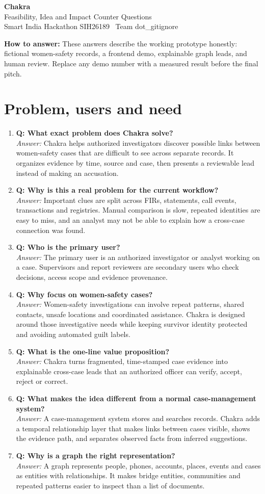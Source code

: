\documentclass[10pt,a4paper]{article}
\newcommand{\qa}[2]{\item \textbf{\color{navy}Q: #1}\\[-1pt]{\color{coral}\textit{Answer:}} #2}
\newcommand{\note}[1]{\vspace{4pt}\noindent\colorbox{paper}{\parbox{\dimexpr\linewidth-2\fboxsep}{\small\textbf{How to answer:} #1}}\vspace{6pt}}
\begin{document}
\begin{center}
{\Huge\bfseries\color{navy}Chakra}\\[3pt]
{\Large Feasibility, Idea and Impact Counter Questions}\\[5pt]
{\normalsize Smart India Hackathon SIH26189 \textbar\ Team dot\_gitignore}
\end{center}
\note{These answers describe the working prototype honestly: fictional women-safety records, a frontend demo, explainable graph leads, and human review. Replace any demo number with a measured result before the final pitch.}

\section{Problem, users and need}
\begin{enumerate}
\qa{What exact problem does Chakra solve?}{Chakra helps authorized investigators discover possible links between women-safety cases that are difficult to see across separate records. It organizes evidence by time, source and case, then presents a reviewable lead instead of making an accusation.}
\qa{Why is this a real problem for the current workflow?}{Important clues are split across FIRs, statements, call events, transactions and registries. Manual comparison is slow, repeated identities are easy to miss, and an analyst may not be able to explain how a cross-case connection was found.}
\qa{Who is the primary user?}{The primary user is an authorized investigator or analyst working on a case. Supervisors and report reviewers are secondary users who check decisions, access scope and evidence provenance.}
\qa{Why focus on women-safety cases?}{Women-safety investigations can involve repeat patterns, shared contacts, unsafe locations and coordinated assistance. Chakra is designed around those investigative needs while keeping survivor identity protected and avoiding automated guilt labels.}
\qa{What is the one-line value proposition?}{Chakra turns fragmented, time-stamped case evidence into explainable cross-case leads that an authorized officer can verify, accept, reject or correct.}
\qa{What makes the idea different from a normal case-management system?}{A case-management system stores and searches records. Chakra adds a temporal relationship layer that makes links between cases visible, shows the evidence path, and separates observed facts from inferred suggestions.}
\qa{Why is a graph the right representation?}{A graph represents people, phones, accounts, places, events and cases as entities with relationships. It makes bridge entities, communities and repeated patterns easier to inspect than a list of documents.}

\end{enumerate}
\end{document}
